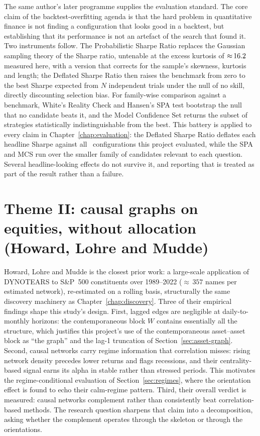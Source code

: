 The same author's later programme supplies the evaluation standard. The core
claim of the backtest-overfitting agenda \cite{bailey2014deflated,
lopezdeprado2023causal} is that the hard problem in quantitative finance is
not finding a configuration that looks good in a backtest, but establishing
that its performance is not an artefact of the search that found it. Two
instruments follow. The Probabilistic Sharpe Ratio \cite{bailey2012psr}
replaces the Gaussian sampling theory of the Sharpe ratio, untenable at the
excess kurtosis of ${\approx}\,16.2$ measured here, with a version
that corrects for the sample's skewness, kurtosis and length; the
Deflated Sharpe Ratio \cite{bailey2014deflated} then raises the
benchmark from zero to the best Sharpe expected from $N$ independent trials
under the null of no skill, directly discounting selection bias. For
family-wise comparison against a benchmark, White's Reality Check
\cite{white2000reality} and Hansen's SPA test \cite{hansen2005spa} bootstrap
the null that no candidate beats it, and the Model Confidence Set
\cite{hansen2011mcs} returns the subset of strategies statistically
indistinguishable from the best. This battery is applied to every claim in
Chapter~\ref{chap:evaluation}: the Deflated Sharpe Ratio deflates each
headline Sharpe against all \rsNtrials\ configurations this project
evaluated, while the SPA and MCS run over the smaller family
of candidates relevant to each question. Several headline-looking effects do
not survive it, and reporting that is treated as part of the result rather
than a failure.

\section{Theme II: causal graphs on equities, without allocation
(Howard, Lohre and Mudde)}
\label{sec:howard-theme}

Howard, Lohre and Mudde \cite{howard2025causal} is the closest prior work: a
large-scale application of DYNOTEARS to S\&P~500 constituents over
1989--2022 (${\approx}\,357$ names per estimated network), re-estimated on
a rolling basis, structurally the same discovery machinery as
Chapter~\ref{chap:discovery}. Three of their empirical findings shape this
study's design. First, lagged edges are negligible at daily-to-monthly
horizons: the contemporaneous block $W$ contains essentially all the
structure, which justifies this project's use of the contemporaneous
asset--asset block as ``the graph'' and the lag-1 truncation of
Section~\ref{sec:asset-graph}.
Second, causal networks carry regime information that correlation
misses: rising network density precedes lower returns and flags recessions,
and their centrality-based signal earns its alpha in stable rather than
stressed periods. This motivates the regime-conditional evaluation of
Section~\ref{sec:regimes}, where the orientation effect is found to echo
their calm-regime pattern. Third, their overall verdict is measured:
causal networks complement rather than consistently beat correlation-based
methods. The research question sharpens that claim into a decomposition, asking whether the
complement operates through the skeleton or through the orientations.


